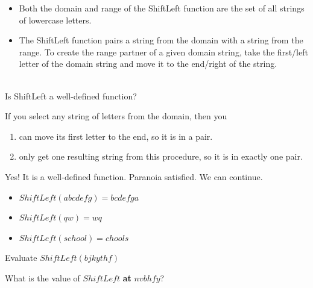 \documentclass{ximera}
\begin{document}
\begin{definition} 
\begin{itemize}
\item Both the domain and range of the ShiftLeft function are the set of all strings of lowercase letters. 
\item The ShiftLeft function pairs a string from the domain with a string from the range. To create the range partner of a given domain string, take the first/left letter of the domain string and move it to the end/right of the string.
\end{itemize}
\end{definition}
\quad \\

Is ShiftLeft a well-defined function?

If you select any string of letters from the domain, then you
\begin{enumerate}
\item can move its first letter to the end, so it is in a pair.
\item only get one resulting string from this procedure, so it is in exactly one pair.
\end{enumerate}
  
Yes!  It is a well-defined function.  Paranoia satisfied. We can continue.


\begin{example}
\begin{itemize}
\item $ShiftLeft(abcdefg) = bcdefga$
\item $ShiftLeft(qw) = wq$
\item $ShiftLeft(school) = chools$
\end{itemize}
\end{example}


\begin{question}
Evaluate $ShiftLeft(bjkythf)$
\begin{multipleChoice}
\end{multipleChoice}
\end{question}


\begin{question}
What is the value of $ShiftLeft$ \textbf{at} $nvbhfy$?
\begin{multipleChoice}
\end{multipleChoice}
\end{question}
\end{document}

